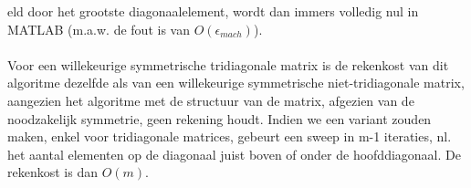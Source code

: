 \documentclass[een]{practicumverslag}
\begin{document}
eld door het grootste diagonaalelement, wordt dan immers volledig nul in MATLAB (m.a.w. de fout is van $O(\epsilon_{mach})$).\\
\\
Voor een willekeurige symmetrische tridiagonale matrix is de rekenkost van dit algoritme dezelfde als van een willekeurige symmetrische niet-tridiagonale matrix, aangezien het algoritme met de structuur van de matrix, afgezien van de noodzakelijk symmetrie, geen rekening houdt. Indien we een variant zouden maken, enkel voor tridiagonale matrices, gebeurt een sweep in m-1 iteraties, nl. het aantal elementen op de diagonaal juist boven of onder de hoofddiagonaal. De rekenkost is dan $O(m)$.

\clearpage
\end{document}
